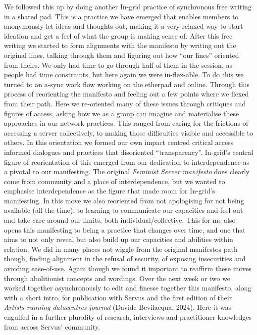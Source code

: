 We followed this up by doing another In-grid practice of synchronous
free writing in a shared pad. This is a practice we have emerged that
enables members to anonymously let ideas and thoughts out, making it a
very relaxed way to start ideation and get a feel of what the group is
making sense of. After this free writing we started to form alignments
with the manifesto by writing out the original lines, talking through
them and figuring out how ``our lines'' oriented from theirs. We only
had time to go through half of them in the session, as people had time
constraints, but here again we were in-flex-able. To do this we turned
to an a-sync work flow working on the etherpad and online. Through this
process of reorienting the manifesto and feeling out a few points where
we flexed from their path. Here we re-oriented many of these issues
through critiques and figures of access, asking how we as a group can
imagine and materialise these approaches in our network practices. This
ranged from caring for the frictions of accessing a server collectively,
to making those difficulties visible and accessible to others. In this
orientation we formed our own impact centred critical access informed
dialogues and practices that disoriented ``transparency''. In-grid's
central figure of reorientation of this emerged from our dedication to
interdependence as a pivotal to our manifesting. The original
\emph{Feminist Server manifesto} does clearly come from community and a
place of interdependence, but we wanted to emphasise interdependence as
the figure that made room for In-grid's manifesting. In this move we
also reoriented from not apologising for not being available (all the
time), to learning to communicate our capacities and feel out and take
care around our limits, both individual/collective. This for me also
opens this manifesting to being a practice that changes over time, and
one that aims to not only reveal but also build up our capacities and
abilities within relation. We did in many places not wiggle from the
original manifestos path though, finding alignment in the refusal of
security, of exposing insecurities and avoiding ease-of-use. Again
though we found it important to reaffirm these moves through
abolitionist concepts and wordings. Over the next week or two we worked
together asynchronously to edit and finesse together this manifesto,
along with a short intro, for publication with Servus and the first
edition of their \emph{Artists running datacentres journal} (Davide
Bevilacqua, 2024). Here it was engulfed in a further plurality of
research, interviews and practitioner knowledges from across Servus'
community.

